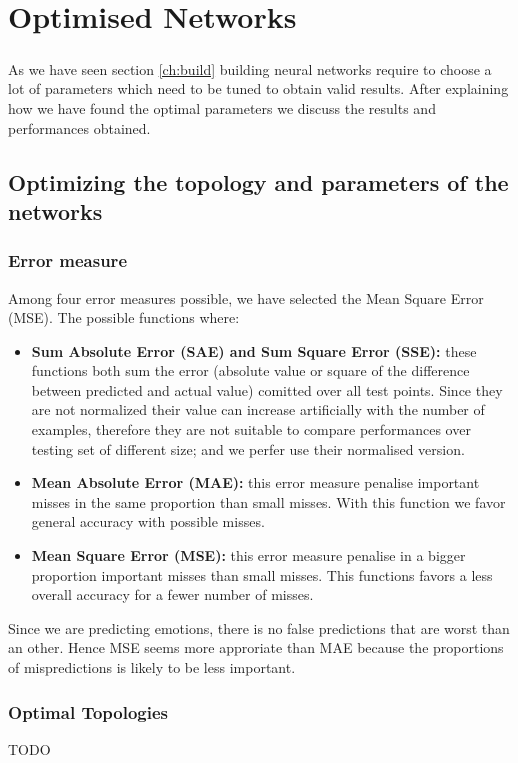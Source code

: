 \documentclass[a4paper,12pt,oneside,final]{report}
\begin{document}
\chapter{Optimised Networks}
\paragraph{}
As we have seen section \ref{ch:build} building neural networks require to choose a lot of parameters which need to be tuned to obtain valid results. After explaining how we have found the optimal parameters we discuss the results and performances obtained.
\section{Optimizing the topology and parameters of the networks}
\subsection{Error measure}
Among four error measures possible, we have selected the Mean Square Error (MSE). The possible functions where:
\begin{itemize}
\item { \bf Sum Absolute Error (SAE) and Sum Square Error (SSE):} these functions both sum the error (absolute value or square of the difference between predicted and actual value) comitted over all test points. Since they are not normalized their value can increase artificially with the number of examples, therefore they are not suitable to compare performances over testing set of different size; and we perfer use their normalised version.
\item { \bf Mean Absolute Error (MAE):} this error measure penalise important misses in the same proportion than small misses. With this function we favor general accuracy with possible misses.
\item { \bf Mean Square Error (MSE):} this error measure penalise in a bigger proportion important misses than small misses. This functions favors a less overall accuracy for a fewer number of misses.
\end{itemize}
Since we are predicting emotions, there is no false predictions that are worst than an other. Hence MSE seems more approriate than MAE because the proportions of mispredictions is likely to be less important.
\subsection{Optimal Topologies}
{\color{red} TODO}
\end{document}
